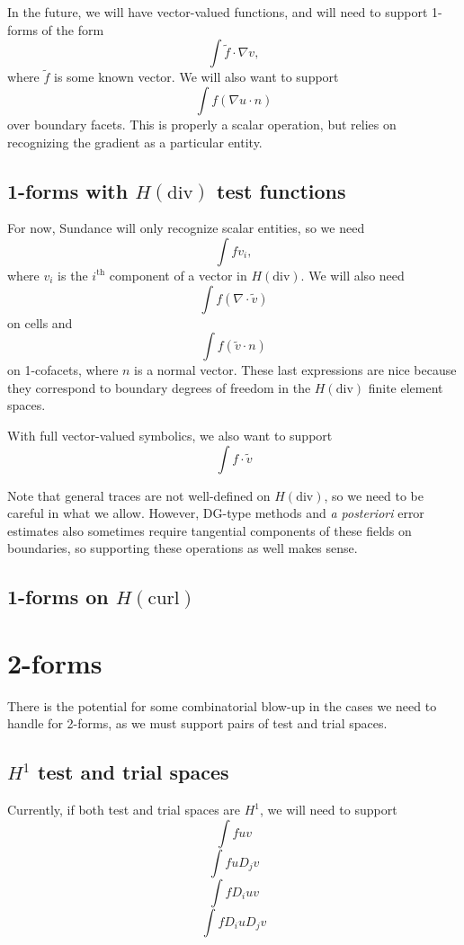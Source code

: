 \documentclass{article}
\begin{document}
In the future, we will have vector-valued
functions, and will need to support 1-forms of the form
\[
\int \tilde{f} \cdot \nabla v,
\]
where \( \tilde{f} \) is some known vector.  We will also want to
support
\[
\int f (\nabla u \cdot n)
\]
over boundary facets.  This is properly a scalar operation, but relies
on recognizing the gradient as a particular entity.


\subsection{1-forms with \( H(\mathrm{div}) \) test functions}
For now, Sundance will only recognize scalar entities, so we need 
\[
\int f v_i,
\]
where \( v_i \) is the \(i^\mathrm{th}\) component of a vector in \(
H(\mathrm{div}) \).  We will also need
\[
\int f ( \nabla \cdot \tilde{v} )
\]
on cells and
\[
\int f (\tilde{v} \cdot n)
\]
on 1-cofacets, where \( n \) is a normal vector.  These last
expressions are nice because they correspond to boundary degrees of
freedom in the \( H(\mathrm{div}) \) finite element spaces.

With full vector-valued symbolics, we also want to support
\[
\int f \cdot \tilde{v}
\]

Note that general traces are not well-defined on \( H(\mathrm{div}) \),
so we need to be careful in what we allow.  However, DG-type methods
and \emph{a posteriori} error estimates also sometimes require
tangential components of these fields on boundaries, so supporting
these operations as well makes sense.

\subsection{1-forms on \(H(\mathrm{curl})\)}


\section{2-forms}
There is the potential for some combinatorial blow-up in the cases we
need to handle for 2-forms, as we must support pairs of test and trial
spaces.  

\subsection{\( H^1 \) test and trial spaces}
Currently, if both test and trial spaces are \( H^1 \), we
will need to support 
\[
\int f u v
\]
\[
\int f u D_j v
\]
\[
\int f D_i u v
\]
\[
\int f D_i u D_j v
\]
\end{document}
